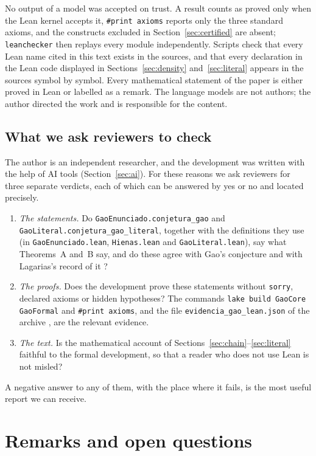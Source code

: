 \documentclass[11pt]{amsart}
\theoremstyle{definition}
\theoremstyle{remark}
\newcommand{\lean}[1]{\nolinkurl{#1}}
\begin{document}
No output of a model was accepted on trust. A result counts as proved only when the Lean kernel accepts it, \texttt{\#print axioms} reports only the three standard axioms, and the constructs excluded in Section~\ref{sec:certified} are absent; \texttt{leanchecker} then replays every module independently. Scripts check that every Lean name cited in this text exists in the sources, and that every declaration in the Lean code displayed in Sections~\ref{sec:density} and~\ref{sec:literal} appears in the sources symbol by symbol. Every mathematical statement of the paper is either proved in Lean or labelled as a remark. The language models are not authors; the author directed the work and is responsible for the content.

\subsection{What we ask reviewers to check}\label{sec:ask}
The author is an independent researcher, and the development was written with the help of AI tools (Section~\ref{sec:ai}). For these reasons we ask reviewers for three separate verdicts, each of which can be answered by yes or no and located precisely.
\begin{enumerate}
\item \emph{The statements.} Do \lean{GaoEnunciado.conjetura_gao} and \lean{GaoLiteral.conjetura_gao_literal}, together with the definitions they use (in \lean{GaoEnunciado.lean}, \lean{Hienas.lean} and \lean{GaoLiteral.lean}), say what Theorems~A and~B say, and do these agree with Gao's conjecture \cite{Gao93} and with Lagarias's record of it \cite{Lag03}?
\item \emph{The proofs.} Does the development prove these statements without \texttt{sorry}, declared axioms or hidden hypotheses? The commands \texttt{lake build GaoCore GaoFormal} and \texttt{\#print axioms}, and the file \texttt{evidencia\_gao\_lean.json} of the archive \cite{Artifact}, are the relevant evidence.
\item \emph{The text.} Is the mathematical account of Sections~\ref{sec:chain}--\ref{sec:literal} faithful to the formal development, so that a reader who does not use Lean is not misled?
\end{enumerate}
A negative answer to any of them, with the place where it fails, is the most useful report we can receive.

\section{Remarks and open questions}\label{sec:remarks}
\end{document}
